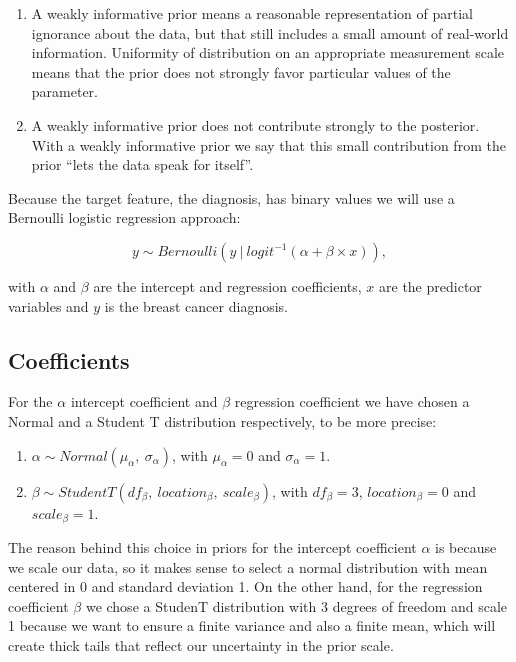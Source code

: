 \documentclass[
]{article}
\providecommand{\tightlist}{%
  \setlength{\itemsep}{0pt}\setlength{\parskip}{0pt}}
\begin{document}
\begin{enumerate}
\def\labelenumi{\arabic{enumi}.}
\item
  A weakly informative prior means a reasonable representation of
  partial ignorance about the data, but that still includes a small
  amount of real-world information. Uniformity of distribution on an
  appropriate measurement scale means that the prior does not strongly
  favor particular values of the parameter.
\item
  A weakly informative prior does not contribute strongly to the
  posterior. With a weakly informative prior we say that this small
  contribution from the prior ``lets the data speak for itself''.
\end{enumerate}

Because the target feature, the diagnosis, has binary values we will use
a Bernoulli logistic regression approach:

\[ y \sim Bernoulli(y\ |\ logit^{-1}(\alpha + \beta \times x)),\]

with \(\alpha\) and \(\beta\) are the intercept and regression
coefficients, \(x\) are the predictor variables and \(y\) is the breast
cancer diagnosis.

\hypertarget{coefficients}{%
\subsection{Coefficients}\label{coefficients}}

For the \(\alpha\) intercept coefficient and \(\beta\) regression
coefficient we have chosen a Normal and a Student T distribution
respectively, to be more precise:

\begin{enumerate}
\def\labelenumi{\arabic{enumi}.}
\tightlist
\item
  \(\alpha \sim Normal(\mu_{\alpha},\ \sigma_{\alpha})\), with
  \(\mu_{\alpha} = 0\) and \(\sigma_{\alpha} = 1\).
\item
  \(\beta \sim StudentT(df_{\beta},\ location_{\beta},\ scale_{\beta})\),
  with \(df_{\beta} = 3\), \(location_{\beta} = 0\) and
  \(scale_{\beta} = 1\).
\end{enumerate}

The reason behind this choice in priors for the intercept coefficient
\(\alpha\) is because we scale our data, so it makes sense to select a
normal distribution with mean centered in 0 and standard deviation 1. On
the other hand, for the regression coefficient \(\beta\) we chose a
StudenT distribution with 3 degrees of freedom and scale 1 because we
want to ensure a finite variance and also a finite mean, which will
create thick tails that reflect our uncertainty in the prior scale.
\end{document}
